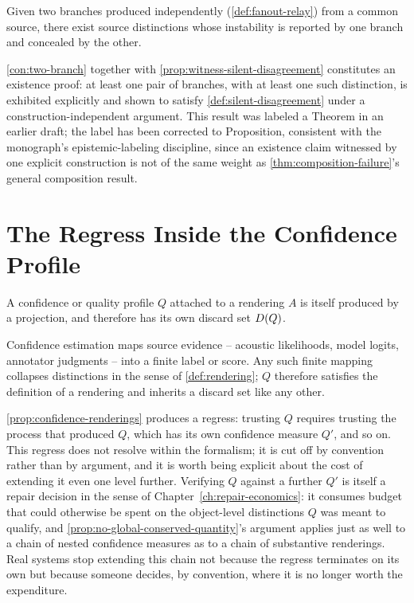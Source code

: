 \begin{proposition}
\label{prop:silent-disagreement}
Given two branches produced independently (\cref{def:fanout-relay}) from
a common source, there exist source distinctions whose instability is
reported by one branch and concealed by the other.
\end{proposition}

\begin{proofsketch}
\cref{con:two-branch} together with \cref{prop:witness-silent-disagreement}
constitutes an existence proof: at least one pair of branches, with at
least one such distinction, is exhibited explicitly and shown to satisfy
\cref{def:silent-disagreement} under a construction-independent argument.
This result was labeled a Theorem in an earlier draft; the label has been
corrected to Proposition, consistent with the monograph's
epistemic-labeling discipline, since an existence claim witnessed by one
explicit construction is not of the same weight as
\cref{thm:composition-failure}'s general composition result.
\end{proofsketch}

\section{The Regress Inside the Confidence Profile}

\begin{proposition}
\label{prop:confidence-renderings}
A confidence or quality profile $Q$ attached to a rendering $A$ is itself
produced by a projection, and therefore has its own discard set
$D(Q)$.
\end{proposition}

\begin{proofsketch}
Confidence estimation maps source evidence -- acoustic likelihoods, model
logits, annotator judgments -- into a finite label or score. Any such
finite mapping collapses distinctions in the sense of
\cref{def:rendering}; $Q$ therefore satisfies the definition of a
rendering and inherits a discard set like any other.
\end{proofsketch}

\cref{prop:confidence-renderings} produces a regress: trusting $Q$
requires trusting the process that produced $Q$, which has its own
confidence measure $Q'$, and so on. This regress does not resolve within
the formalism; it is cut off by convention rather than by argument, and
it is worth being explicit about the cost of extending it even one level
further. Verifying $Q$ against a further $Q'$ is itself a repair
decision in the sense of Chapter~\ref{ch:repair-economics}: it consumes
budget that could otherwise be spent on the object-level distinctions
$Q$ was meant to qualify, and \cref{prop:no-global-conserved-quantity}'s
argument applies just as well to a chain of nested confidence measures as
to a chain of substantive renderings. Real systems stop extending this
chain not because the regress terminates on its own but because someone
decides, by convention, where it is no longer worth the expenditure.

